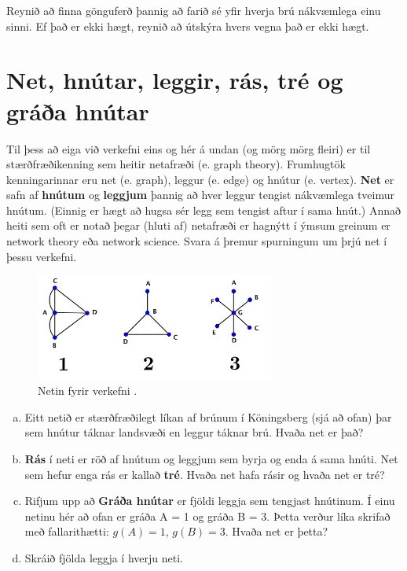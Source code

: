 \documentclass[b5paper,12pt]{book}
\renewcommand*\thesection{\arabic{section}}
\begin{document}
\noindent 
Reynið að finna gönguferð þannig að farið sé yfir hverja brú nákvæmlega einu sinni. Ef það er ekki hægt, reynið að útskýra hvers vegna það er ekki hægt.

\section{Net, hnútar, leggir, rás, tré og gráða hnútar}
Til þess að eiga við verkefni eins og hér á undan (og mörg mörg fleiri) er til stærðfræðikenning sem heitir netafræði (e. graph theory). Frumhugtök kenningarinnar eru net (e. graph), leggur (e. edge) og hnútur (e. vertex). \textbf{Net} er safn af \textbf{hnútum} og \textbf{leggjum} þannig að hver leggur tengist nákvæmlega tveimur hnútum. (Einnig er hægt að hugsa sér legg sem tengist aftur í sama hnút.) Annað heiti sem oft er notað þegar (hluti af) netafræði er hagnýtt í ýmsum greinum er network theory eða network science. Svara á þremur spurningum um þrjú net í þessu verkefni.

\begin{figure}[h]
  \includegraphics[width=0.7\textwidth, center]{Myndir/fyrstunet.png}
  \caption*{Netin fyrir verkefni \thesection{}.}
\end{figure}

\begin{enumerate}[(a)]
\item Eitt netið er stærðfræðilegt líkan af brúnum í Köningsberg (sjá að ofan) þar sem hnútur táknar landsvæði en leggur táknar brú. Hvaða net er það?
\item \textbf{Rás} í neti er röð af hnútum og leggjum sem byrja og enda á sama hnúti. Net sem hefur enga rás er kallað \textbf{tré}. Hvaða net hafa rásir og hvaða net er tré?
\item Rifjum upp að \textbf{Gráða hnútar} er fjöldi leggja sem tengjast hnútinum. Í einu netinu hér að ofan er gráða A = 1 og gráða B = 3. Þetta verður líka skrifað með fallarithætti: $g(A)=1$, $g(B)=3$. Hvaða net er þetta?
\item Skráið fjölda leggja í hverju neti. 
\end{enumerate}
 
\end{document}
